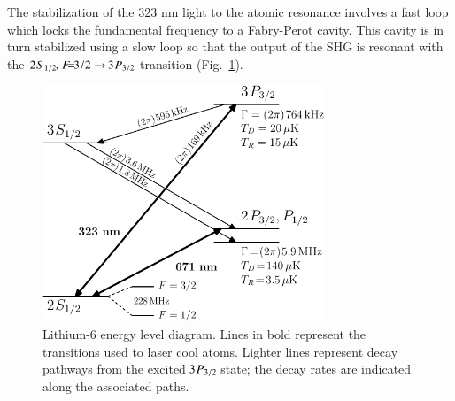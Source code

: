 \documentclass[oneside,12pt]{memoir}
\newcommand{\twos}[1]{\ensuremath{\hspace{-1pt}2\hspace{0.5pt}\hspace{0pt}S_{#1}\hspace{-1pt}}}
\newcommand{\trep}[1]{\ensuremath{\hspace{-1pt}3\hspace{0.5pt}\hspace{0pt}P_{#1}\hspace{-1pt}}}
\newcommand{\cm}{\ensuremath{,\hspace{1pt}}}
\newcommand{\f}[1]{\ensuremath{F\hspace{-5pt}=\hspace{-4pt}#1}}
\begin{document}
The stabilization of the 323 nm light to the atomic resonance involves a fast
loop which locks the fundamental frequency to a Fabry-Perot cavity.   This
cavity is in turn stabilized using a slow loop so that the output of the SHG is
resonant with the $\twos{1/2}\cm\f{3/2}\rightarrow\trep{3/2}$ transition
(Fig.~\ref{fig:323levels}).   \begin{figure} \centering
\includegraphics[width=0.75\textwidth]{../figures/levels/323-levels/lithium.pdf}
\caption[Lithium-6 energy level diagram showing the \trep{3/2} state]{\small
Lithium-6 energy level diagram. Lines in bold represent the transitions used to
laser cool atoms. Lighter lines represent decay pathways from the excited
\trep{3/2} state; the decay rates are indicated along the associated paths. }
\label{fig:323levels} \end{figure} 


\end{document}

